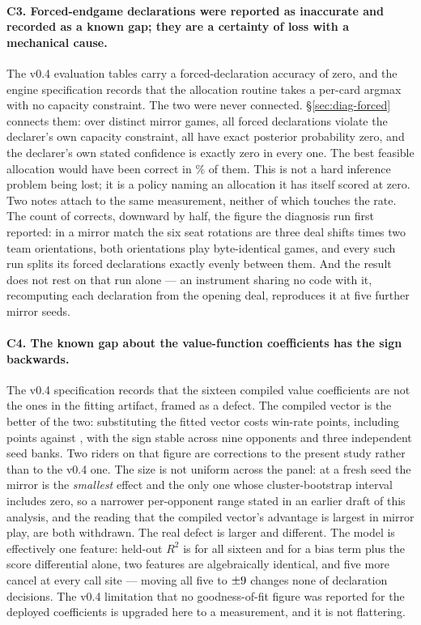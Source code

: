 \paragraph{C3. Forced-endgame declarations were reported as inaccurate and
recorded as a known gap; they are a certainty of loss with a mechanical cause.}
The v0.4 evaluation tables carry a forced-declaration accuracy of zero, and the
engine specification records that the allocation routine takes a per-card argmax
with no capacity constraint. The two were never connected. \S\ref{sec:diag-forced}
connects them: over \numForcedGames{} distinct mirror games, all \numForcedN{}
forced declarations violate the declarer's own capacity constraint, all have
exact posterior probability zero, and the declarer's own stated confidence is
exactly zero in every one. The best feasible allocation would have been correct
in \numFeasibleRight\% of them. This is not a hard inference problem being lost;
it is a policy naming an allocation it has itself scored at zero. Two notes
attach to the same measurement, neither of which touches the rate. The count of
\numForcedN{} corrects, downward by half, the figure the diagnosis run first
reported: in a mirror match the six seat rotations are three deal shifts times
two team orientations, both orientations play byte-identical games, and every
such run splits its forced declarations exactly evenly between them. And the
result does not rest on that run alone --- an instrument sharing no code with it,
recomputing each declaration from the opening deal, reproduces it at five further
mirror seeds.

\paragraph{C4. The known gap about the value-function coefficients has the sign
backwards.} The v0.4 specification records that the sixteen compiled value
coefficients are not the ones in the fitting artifact, framed as a defect. The
compiled vector is the better of the two: substituting the fitted vector costs
\numEfourteenRange{} win-rate points, including \numEfourteenCost{} points
against \vthree{}, with the sign stable across nine opponents and three
independent seed banks. Two riders on that figure are corrections to the present
study rather than to the v0.4 one. The size is not uniform across the panel: at a
fresh seed the mirror is the \emph{smallest} effect and the only one whose
cluster-bootstrap interval includes zero, so a narrower per-opponent range stated
in an earlier draft of this analysis, and the reading that the compiled vector's
advantage is largest in mirror play, are both withdrawn. The real defect is
larger and different. The model is
effectively one feature: held-out $R^2$ is \numValueRSq{} for all sixteen and
\numValueRSqScore{} for a bias term plus the score differential alone, two
features are algebraically identical, and five more cancel at every call site ---
moving all five to $\pm9$ changes none of \numDeadFeatureDecisions{} declaration
decisions. The v0.4 limitation that no goodness-of-fit figure was reported for
the deployed coefficients is upgraded here to a measurement, and it is not
flattering.

